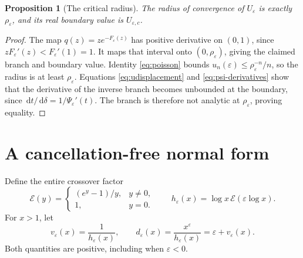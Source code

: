 \documentclass[11pt,a4paper]{article}
\numberwithin{equation}{section}
\newtheorem{proposition}[theorem]{Proposition}
\theoremstyle{definition}
\theoremstyle{remark}
\newcommand{\eps}{\varepsilon}
\newcommand{\dd}{\,\mathrm d}
\newcommand{\cE}{\mathcal E}
\begin{document}
\begin{proposition}[The critical radius]
The radius of convergence of \(U_\eps\) is exactly \(\rho_\eps\), and its
real boundary value is \(U_{\eps,c}\).
\end{proposition}
\begin{proof}
The map \(q(z)=ze^{-F_\eps(z)}\) has positive derivative on \((0,1)\), since
\(zF_\eps'(z)<F_\eps'(1)=1\). It maps that interval onto
\((0,\rho_\eps)\), giving the claimed branch and boundary value. Identity
\eqref{eq:poisson} bounds \(u_n(\eps)\le\rho_\eps^{-n}/n\), so the radius is
at least \(\rho_\eps\). Equations \eqref{eq:udisplacement} and
\eqref{eq:psi-derivatives} show that the derivative of the inverse branch
becomes unbounded at the boundary, since \(\dd t/\dd\delta=1/\Psi_\eps'(t)\).
The branch is therefore not analytic at \(\rho_\eps\), proving equality.
\end{proof}

\section{A cancellation-free normal form}
\label{sec:normal}
Define the entire crossover factor
\begin{equation}
 \cE(y)=\begin{cases}(e^y-1)/y,&y\ne0,\\1,&y=0.\end{cases}
 \qquad h_\eps(x)=\log x\,\cE(\eps\log x).
 \label{eq:E}
\end{equation}
For \(x>1\), let
\begin{equation}
 v_\eps(x)=\frac1{h_\eps(x)},\qquad
 d_\eps(x)=\frac{x^\eps}{h_\eps(x)}=\eps+v_\eps(x).
 \label{eq:vd}
\end{equation}
Both quantities are positive, including when \(\eps<0\).
\end{document}
